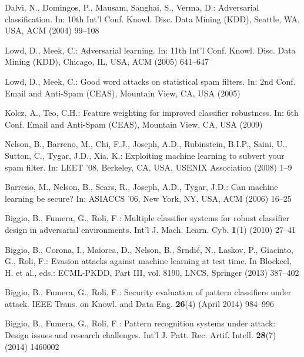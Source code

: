 \documentclass[runningheads,a4paper]{llncs}
\begin{document}
\begin{thebibliography}{10}

Dalvi, N., Domingos, P., Mausam, Sanghai, S., Verma, D.:
\newblock Adversarial classification.
\newblock In: 10th Int'l Conf. Knowl. Disc. Data Mining (KDD), Seattle, WA, USA, ACM (2004)  99--108

Lowd, D., Meek, C.:
\newblock Adversarial learning.
\newblock In: 11th Int'l Conf. Knowl. Disc. Data Mining (KDD), Chicago, IL, USA, ACM  (2005)  641--647

Lowd, D., Meek, C.:
\newblock Good word attacks on statistical spam filters.
\newblock In: 2nd Conf. Email and Anti-Spam (CEAS), Mountain View, CA, USA (2005)

Kolcz, A., Teo, C.H.:
\newblock Feature weighting for improved classifier robustness.
\newblock In: 6th Conf. Email and Anti-Spam (CEAS), Mountain View, CA, USA (2009)

Nelson, B., Barreno, M., Chi, F.J., Joseph, A.D., Rubinstein, B.I.P., Saini,
  U., Sutton, C., Tygar, J.D., Xia, K.:
\newblock Exploiting machine learning to subvert your spam filter.
\newblock In: LEET '08, Berkeley, CA, USA, USENIX Association (2008)
  1--9

Barreno, M., Nelson, B., Sears, R., Joseph, A.D., Tygar, J.D.:
\newblock Can machine learning be secure?
\newblock In: ASIACCS '06, New York, NY, USA, ACM (2006)  16--25

Biggio, B., Fumera, G., Roli, F.:
\newblock Multiple classifier systems for robust classifier design in
  adversarial environments.
\newblock Int'l J. Mach. Learn. Cyb. \textbf{1}(1) (2010)  27--41

Biggio, B., Corona, I., Maiorca, D., Nelson, B., \v{S}rndi\'{c}, N., Laskov,
  P., Giacinto, G., Roli, F.:
\newblock Evasion attacks against machine learning at test time.
\newblock In Blockeel, H. et al., eds.: ECML-PKDD, Part III, vol. 8190, LNCS, Springer  (2013) 387--402

Biggio, B., Fumera, G., Roli, F.:
\newblock Security evaluation of pattern classifiers under attack.
\newblock IEEE Trans. on Knowl. and Data Eng. \textbf{26}(4)
  (April 2014)  984--996

Biggio, B., Fumera, G., Roli, F.:
\newblock Pattern recognition systems under attack: Design issues and research
  challenges.
\newblock Int'l J. Patt. Rec. Artif. Intell. \textbf{28}(7) (2014) 1460002


\end{thebibliography}
\end{document}
